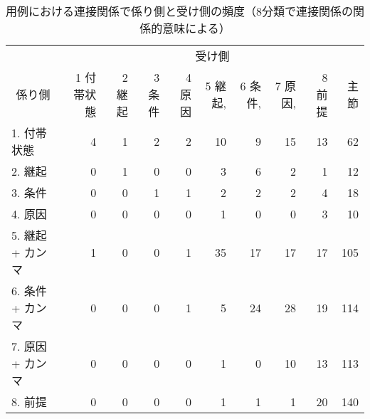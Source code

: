 \begin{table*}
\caption{用例における連接関係で係り側と受け側の頻度（8分類で連接関係の関係的意味による）}
\label{table:freq8sm}
\begin{tabular}{|l|r|r|r|r|r|r|r|r|r|}
\hline
\multicolumn{1}{|p{10zw}|}{} & \multicolumn{9}{|c|}{受け側}\\
\cline{2-10}
\multicolumn{1}{|c|}{係り側} & \multicolumn{1}{|p{2zw}|}{1 付帯状態} & \multicolumn{1}{|p{2zw}|}{2 継起} & \multicolumn{1}{|p{2zw}|}{3 条件} & \multicolumn{1}{|p{2zw}|}{4 原因} & \multicolumn{1}{|p{2zw}|}{5 継起,} & \multicolumn{1}{|p{2zw}|}{6 条件,} & \multicolumn{1}{|p{2zw}|}{7 原因,} & \multicolumn{1}{|p{2zw}|}{8 前提} & \multicolumn{1}{|p{2zw}|}{主節}\\
\hline
1. 付帯状態 & 4 & 1 & 2 & 2 & 10 & 9 & 15 & 13 & 62 \\
\cline{2-2}
2. 継起 & 0 & 1 & 0 & 0 & 3 & 6 & 2 & 1 & 12 \\
\cline{3-3}
3. 条件 & 0 & 0 & 1 & 1 & 2 & 2 & 2 & 4 & 18 \\
\cline{4-4}
4. 原因 & 0 & 0 & 0 & 0 & 1 & 0 & 0 & 3 & 10 \\
\cline{5-5}
5. 継起 + カンマ & 1 & 0 & 0 & 1 & 35 & 17 & 17 & 17 & 105 \\
\cline{6-6}
6. 条件 + カンマ & 0 & 0 & 0 & 1 & 5 & 24 & 28 & 19 & 114 \\
\cline{7-7}
7. 原因 + カンマ & 0 & 0 & 0 & 0 & 1 & 0 & 10 & 13 & 113 \\
\cline{8-8}
8. 前提 & 0 & 0 & 0 & 0 & 1 & 1 & 1 & 20 & 140 \\
\hline
\end{tabular}
\end{table*}

